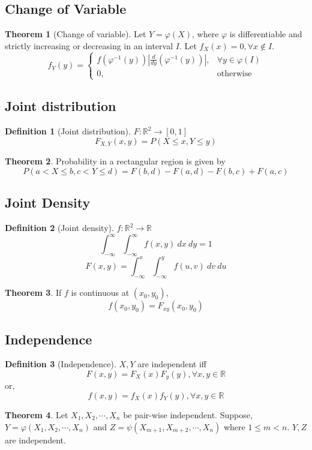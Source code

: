 \documentclass[10pt, a4paper]{extarticle}
\theoremstyle{definition}
\newtheorem{thm}{Theorem}
\newtheorem{defn}{Definition}
\begin{document}
	\subsection{Change of Variable}
	\begin{thm}[Change of variable]
		Let $Y=\varphi(X)$, where $\varphi$ is differentiable and strictly increasing or decreasing in an interval $I$. Let $f_X(x)=0,\forall x\notin I$.
		\[f_Y(y)=
			\begin{cases}
				f\left(\varphi^{-1}(y)\right)\left|\frac{d}{dy}\left(\varphi^{-1}(y)\right)\right|,&\forall y\in\varphi(I)\\
				0,&\text{otherwise}
			\end{cases}
		\]
	\end{thm}

	\subsection{Joint distribution}
	\begin{defn}[Joint distribution]
		$F:\mathbb{R}^2\to[0,1]$
		\[F_{X,Y}(x,y)=P(X\leq x,Y\leq y)\]
	\end{defn}
	\begin{thm}
		Probability in a rectangular region is given by
		\[P(a<X\leq b,c<Y\leq d)=F(b,d)-F(a,d)-F(b,c)+F(a,c)\]
	\end{thm}

	\subsection{Joint Density}
	\begin{defn}[Joint density]
		$f:\mathbb{R}^2\to\mathbb{R}$
		\[\int_{-\infty}^\infty \int_{-\infty}^\infty f(x,y)\ dx\ dy=1\]
		\[F(x,y)=\int_{-\infty}^x \int_{-\infty}^y f(u,v)\ dv\ du\]
	\end{defn}

	\begin{thm}
		If $f$ is continuous at $(x_0,y_0)$,
		\[f(x_0,y_0)=F_{xy}(x_0,y_0)\]
	\end{thm}

	\subsection{Independence}
	\begin{defn}[Independence]
		$X,Y$ are independent iff
		\[F(x,y)=F_X(x)F_y(y),\forall x,y\in\mathbb{R}\]
		or,
		\[f(x,y)=f_X(x)f_Y(y),\forall x,y\in\mathbb{R}\]
	\end{defn}
	\begin{thm}
		Let $X_1,X_2,\cdots, X_n$ be pair-wise independent. Suppose, $Y=\varphi(X_1,X_2,\cdots,X_n)$ and $Z=\psi(X_{m+1},X_{m+2},\cdots,X_n)$ where $1\leq m<n$. $Y,Z$ are independent.
	\end{thm}
\end{document}
